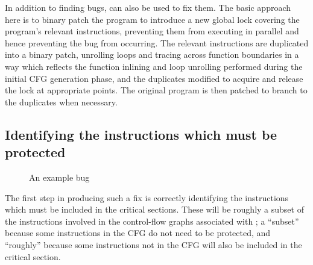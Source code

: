 In addition to finding bugs, {\technique} can also be used to fix
them.  The basic approach here is to binary patch the program to
introduce a new global lock covering the program's relevant
instructions, preventing them from executing in parallel and hence
preventing the bug from occurring.  The relevant instructions are
duplicated into a binary patch, unrolling loops and tracing across
function boundaries in a way which reflects the function inlining and
loop unrolling performed during the initial CFG generation phase, and
the duplicates modified to acquire and release the lock at appropriate
points.  The original program is then patched to branch to the
duplicates when necessary.

\subsection{Identifying the instructions which must be protected}

\begin{figure}
  \hspace{-5mm}
  \hspace{-10mm}
  \caption{An example bug}
  \label{fig:fix_bug:complex_local}
\end{figure}

The first step in producing such a fix is correctly identifying the
instructions which must be included in the critical sections.  These
will be roughly a subset of the instructions involved in the
control-flow graphs associated with \StateMachines; a ``subset''
because some instructions in the CFG do not need to be protected, and
``roughly'' because some instructions not in the CFG will also be
included in the critical section.

